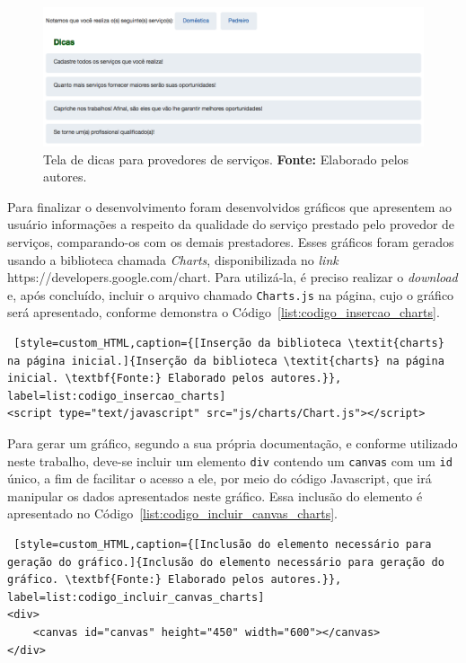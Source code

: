 \begin{figure}[h!]
	\centerline{\includegraphics[scale=0.4]{./imagens/dicas-randomicas.png}}
	\caption[Tela de dicas para provedores de serviços.]
	{Tela de dicas para provedores de serviços. \textbf{Fonte:} Elaborado pelos autores.}
	\label{fig:dicas_randomicas}
\end{figure}

\par Para finalizar o desenvolvimento foram desenvolvidos gráficos que apresentem ao usuário informações a respeito da qualidade do serviço prestado pelo provedor de serviços, comparando-os com os demais prestadores. Esses gráficos foram gerados usando a biblioteca chamada \textit{Charts}, disponibilizada no \textit{link} https://developers.google.com/chart. Para utilizá-la, é preciso realizar o \textit{download} e, após concluído, incluir o arquivo chamado \texttt{Charts.js} na página, cujo o gráfico será apresentado, conforme demonstra o Código~\ref{list:codigo_insercao_charts}.

\begin{lstlisting} [style=custom_HTML,caption={[Inserção da biblioteca \textit{charts} na página inicial.]{Inserção da biblioteca \textit{charts} na página inicial. \textbf{Fonte:} Elaborado pelos autores.}}, label=list:codigo_insercao_charts] 	
<script type="text/javascript" src="js/charts/Chart.js"></script>
\end{lstlisting}

\par Para gerar um gráfico, segundo a sua própria documentação, e conforme utilizado neste trabalho, deve-se incluir um elemento \texttt{div} contendo um \texttt{canvas} com um \texttt{id} único, a fim de facilitar o acesso a ele, por meio do código Javascript, que irá manipular os dados apresentados neste gráfico. Essa inclusão do elemento é apresentado no Código~\ref{list:codigo_incluir_canvas_charts}.

\begin{lstlisting} [style=custom_HTML,caption={[Inclusão do elemento necessário para geração do gráfico.]{Inclusão do elemento necessário para geração do gráfico. \textbf{Fonte:} Elaborado pelos autores.}}, label=list:codigo_incluir_canvas_charts] 	
<div>
	<canvas id="canvas" height="450" width="600"></canvas>
</div>
\end{lstlisting}

